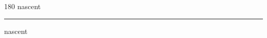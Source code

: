 
\begin{frame}
\begin{center}
\begin{turn}{180}
{\fontsize{2.5cm}{1em}\selectfont nascent}
\end{turn}
\vspace{1em}\par  
\hrule
\vspace{1em}\par  
{\fontsize{2.5cm}{1em}\selectfont nascent}
\end{center}
\end{frame}
